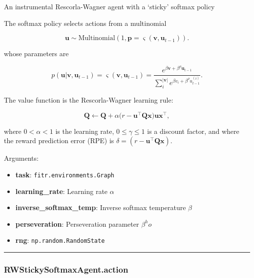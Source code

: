 \begin{Shaded}
\begin{Highlighting}[]
\end{Highlighting}
\end{Shaded}

An instrumental Rescorla-Wagner agent with a `sticky' softmax policy

The softmax policy selects actions from a multinomial

\[
\mathbf u \sim \mathrm{Multinomial}(1, \mathbf p=\varsigma(\mathbf v, \mathbf u_{t-1})).
\]

whose parameters are

\[
p(\mathbf u|\mathbf v, \mathbf u_{t-1}) = \varsigma(\mathbf v, \mathbf u_{t-1}) = \frac{e^{\beta \mathbf v + \beta^\rho \mathbf u_{t-1}}}{\sum_{i}^{|\mathbf v|} e^{\beta v_i + \beta^\rho u_{t-1}^{(i)}}}.
\]

The value function is the Rescorla-Wagner learning rule:

\[
\mathbf Q \gets \mathbf Q + \alpha \big(r - \mathbf u^\top \mathbf Q \mathbf x \big) \mathbf u \mathbf x^\top,
\]

where \(0 < \alpha < 1\) is the learning rate, \(0 \leq \gamma \leq 1\)
is a discount factor, and where the reward prediction error (RPE) is
\(\delta = (r - \mathbf u^\top \mathbf Q \mathbf x)\).

Arguments:

\begin{itemize}
\tightlist
\item
  \textbf{task}: \texttt{fitr.environments.Graph}
\item
  \textbf{learning\_rate}: Learning rate \(\alpha\)
\item
  \textbf{inverse\_softmax\_temp}: Inverse softmax temperature \(\beta\)
\item
  \textbf{perseveration}: Perseveration parameter \(\beta^ ho\)
\item
  \textbf{rng}: \texttt{np.random.RandomState}
\end{itemize}

\begin{center}\rule{0.5\linewidth}{\linethickness}\end{center}

\subsubsection{RWStickySoftmaxAgent.action}\label{rwstickysoftmaxagent.action}

